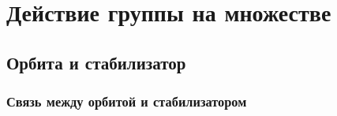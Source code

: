 \section{Действие группы на множестве}
\subsection{Орбита и стабилизатор}
\subsubsection{Связь между орбитой и стабилизатором}


